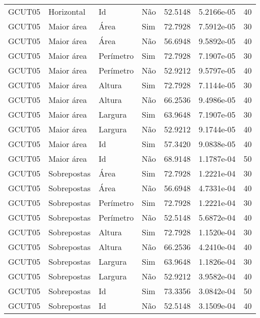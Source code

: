 \begin{tabular}{llllrrr}
GCUT05    & Horizontal  & Id        & Não         & 52.5148      & 5.2166e-05 & 40       \\
GCUT05    & Maior área  & Área      & Sim         & 72.7928      & 7.5912e-05 & 30       \\
GCUT05    & Maior área  & Área      & Não         & 56.6948      & 9.5892e-05 & 40       \\
GCUT05    & Maior área  & Perímetro & Sim         & 72.7928      & 7.1907e-05 & 30       \\
GCUT05    & Maior área  & Perímetro & Não         & 52.9212      & 9.5797e-05 & 40       \\
GCUT05    & Maior área  & Altura    & Sim         & 72.7928      & 7.1144e-05 & 30       \\
GCUT05    & Maior área  & Altura    & Não         & 66.2536      & 9.4986e-05 & 40       \\
GCUT05    & Maior área  & Largura   & Sim         & 63.9648      & 7.1907e-05 & 30       \\
GCUT05    & Maior área  & Largura   & Não         & 52.9212      & 9.1744e-05 & 40       \\
GCUT05    & Maior área  & Id        & Sim         & 57.3420      & 9.0838e-05 & 40       \\
GCUT05    & Maior área  & Id        & Não         & 68.9148      & 1.1787e-04 & 50       \\
GCUT05    & Sobrepostas & Área      & Sim         & 72.7928      & 1.2221e-04 & 30       \\
GCUT05    & Sobrepostas & Área      & Não         & 56.6948      & 4.7331e-04 & 40       \\
GCUT05    & Sobrepostas & Perímetro & Sim         & 72.7928      & 1.2221e-04 & 30       \\
GCUT05    & Sobrepostas & Perímetro & Não         & 52.5148      & 5.6872e-04 & 40       \\
GCUT05    & Sobrepostas & Altura    & Sim         & 72.7928      & 1.1520e-04 & 30       \\
GCUT05    & Sobrepostas & Altura    & Não         & 66.2536      & 4.2410e-04 & 40       \\
GCUT05    & Sobrepostas & Largura   & Sim         & 63.9648      & 1.1826e-04 & 30       \\
GCUT05    & Sobrepostas & Largura   & Não         & 52.9212      & 3.9582e-04 & 40       \\
GCUT05    & Sobrepostas & Id        & Sim         & 73.3356      & 3.0842e-04 & 50       \\
GCUT05    & Sobrepostas & Id        & Não         & 52.5148      & 3.1509e-04 & 40       \\
\hline
\end{tabular}